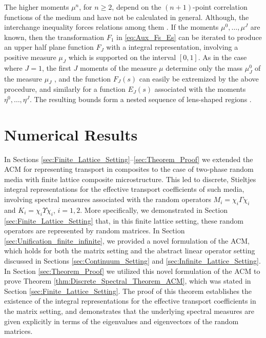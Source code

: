\documentclass{cmslatex}
\begin{document}
The higher moments $\mu^n$, for $n\geq2$, depend on the $(n+1)$-point
correlation functions of the medium \cite{Golden:CMP-473} and have not
be calculated in general. Although, the interchange inequality forces
relations among them \cite{Milton:JAP-5294}. If the moments
$\mu^0,\ldots,\mu^J$ are known, then the transformation $F_1$ in
\eqref{eq:Aux_Fs_Es} can be iterated to produce an upper half plane
function $F_J$ with a integral representation, involving a positive
measure $\mu_J$ which is supported on the interval $[0,1]$. As in the
case where $J=1$, the first $J$ moments of the measure $\mu$ determine
only the mass $\mu_J^0$ of the measure $\mu_J$ \cite{Golden:JMPS-333}, and
the function $F_J(s)$ can easily be extremized by the above procedure,
and similarly for a function $E_J(s)$ associated with the moments
$\eta^0,\ldots,\eta^J$. The resulting bounds form a nested sequence of
lens-shaped regions \cite{Golden:JMPS-333}.




\section{Numerical Results}\label{sec:Numerical_Results}
%
In Sections \ref{sec:Finite_Lattice_Setting}--\ref{sec:Theorem_Proof}
we extended the ACM for representing transport in composites
to the case of two-phase random media with finite lattice composite 
microstructure. This led to discrete, Stieltjes integral
representations for the effective transport coefficients of such
media, involving spectral measures associated with the random
operators $M_i=\chi_i\Gamma\chi_i$ and $K_i=\chi_i\Upsilon\chi_i$, $i=1,2$. More specifically,
we demonstrated in Section \ref{sec:Finite_Lattice_Setting} that, in
this finite lattice setting, these random operators are represented by
random matrices. In Section \ref{sec:Unification_finite_infinite}, we
provided a novel formulation of the ACM, which holds for both the
matrix setting and the abstract linear operator setting discussed in
Sections \ref{sec:Continuum_Setting} and
\ref{sec:Infinite_Lattice_Setting}. In Section \ref{sec:Theorem_Proof}
we utilized this novel formulation of the ACM to prove Theorem 
\ref{thm:Discrete_Spectral_Theorem_ACM}, which was stated in Section  
\ref{sec:Finite_Lattice_Setting}. The proof of this theorem
establishes the existence of the integral representations for the
effective transport coefficients in the matrix setting, and
demonstrates that the underlying spectral measures are given
explicitly in terms of the eigenvalues and eigenvectors of the random
matrices. 
\end{document}
